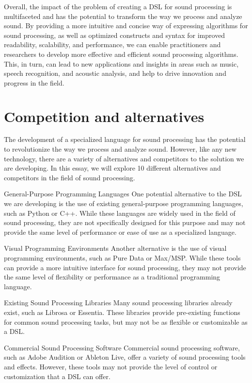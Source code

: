 Overall, the impact of the problem of creating a DSL for sound processing is multifaceted and has the potential to transform the way we process and analyze sound. By providing a more intuitive and concise way of expressing algorithms for sound processing, as well as optimized constructs and syntax for improved readability, scalability, and performance, we can enable practitioners and researchers to develop more effective and efficient sound processing algorithms. This, in turn, can lead to new applications and insights in areas such as music, speech recognition, and acoustic analysis, and help to drive innovation and progress in the field.
\section{Competition and alternatives } 
The development of a specialized language for sound processing has the potential to revolutionize the way we process and analyze sound. However, like any new technology, there are a variety of alternatives and competitors to the solution we are developing. In this essay, we will explore 10 different alternatives and competitors in the field of sound processing.

General-Purpose Programming Languages
One potential alternative to the DSL we are developing is the use of existing general-purpose programming languages, such as Python or C++. While these languages are widely used in the field of sound processing, they are not specifically designed for this purpose and may not provide the same level of performance or ease of use as a specialized language.

Visual Programming Environments
Another alternative is the use of visual programming environments, such as Pure Data or Max/MSP. While these tools can provide a more intuitive interface for sound processing, they may not provide the same level of flexibility or performance as a traditional programming language.

Existing Sound Processing Libraries
Many sound processing libraries already exist, such as Librosa or Essentia. These libraries provide pre-existing functions for common sound processing tasks, but may not be as flexible or customizable as a DSL.

Commercial Sound Processing Software
Commercial sound processing software, such as Adobe Audition or Ableton Live, offer a variety of sound processing tools and effects. However, these tools may not provide the level of control or customization that a DSL can offer.

